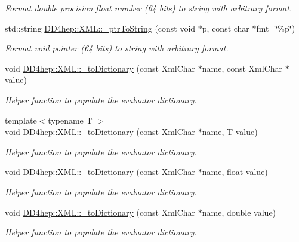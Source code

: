 \begin{DoxyCompactItemize}
\begin{DoxyCompactList}\small\item\em Format double procision float number (64 bits) to string with arbitrary format. \item\end{DoxyCompactList}\item 
std::string \hyperlink{group___d_d4_h_e_p___x_m_l_ga38094fef4f65786fdece09b69b41d07b}{DD4hep::XML::\_\-ptrToString} (const void $\ast$p, const char $\ast$fmt=\char`\"{}\%p\char`\"{})
\begin{DoxyCompactList}\small\item\em Format void pointer (64 bits) to string with arbitrary format. \item\end{DoxyCompactList}\item 
void \hyperlink{group___d_d4_h_e_p___x_m_l_ga453206d36ab8257b39337846e5a1795d}{DD4hep::XML::\_\-toDictionary} (const XmlChar $\ast$name, const XmlChar $\ast$value)
\begin{DoxyCompactList}\small\item\em Helper function to populate the evaluator dictionary. \item\end{DoxyCompactList}\item 
{\footnotesize template$<$typename T $>$ }\\void \hyperlink{group___d_d4_h_e_p___x_m_l_ga45b176504b155d5f47b9c7cfdc5a9255}{DD4hep::XML::\_\-toDictionary} (const XmlChar $\ast$name, \hyperlink{class_t}{T} value)
\begin{DoxyCompactList}\small\item\em Helper function to populate the evaluator dictionary. \item\end{DoxyCompactList}\item 
void \hyperlink{group___d_d4_h_e_p___x_m_l_gac7be63582e2bd7ad2bad66544cb45ede}{DD4hep::XML::\_\-toDictionary} (const XmlChar $\ast$name, float value)
\begin{DoxyCompactList}\small\item\em Helper function to populate the evaluator dictionary. \item\end{DoxyCompactList}\item 
void \hyperlink{group___d_d4_h_e_p___x_m_l_ga7a346eee87fe45320da3ebb2e1958af5}{DD4hep::XML::\_\-toDictionary} (const XmlChar $\ast$name, double value)
\begin{DoxyCompactList}\small\item\em Helper function to populate the evaluator dictionary. \item\end{DoxyCompactList}\item 

\end{DoxyCompactItemize}
